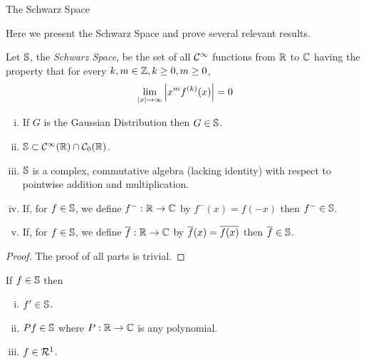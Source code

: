 \begin{section}{The Schwarz Space}

	Here we present the Schwarz Space and prove
	several relevant results.
	

\begin{defn}
	Let $\mathbb{S}$, the \emph{Schwarz Space}, be the set of all
	$\mathcal{C}^{\infty}$ functions from $\mathbb{R}$ to $\mathbb{C}$ having the
	property that for every $k,m \in \mathbb{Z}, k \geq 0,
	m \geq 0$,
		\begin{displaymath}
			\lim_{\left \vert {x} \right \vert \rightarrow \infty}
				\left \vert {x^m f^{(k)}(x)} \right \vert = 0
		\end{displaymath}
\end{defn}
	

\begin{prop}
	\begin{enumerate}[i)]
		\item
			If $G$ is the Gaussian Distribution then $G \in \mathbb{S}$.
		\item
			$\mathbb{S} \subset \mathcal{C}^{\infty}(\mathbb{R}) \cap \mathcal{C}_0(\mathbb{R})$.
		\item
			$\mathbb{S}$ is a complex, commutative algebra (lacking
			identity) with respect to pointwise addition and
			multiplication.
		\item
			If, for $f \in \mathbb{S}$, we define $f^-:\mathbb{R} \rightarrow 
			\mathbb{C}$ by $f^-(x) = f(-x)$ then $f^- \in \mathbb{S}$.
		\item
			If, for $f \in \mathbb{S}$, we define $\overline{f}:\mathbb{R} \rightarrow
			\mathbb{C}$ by $\overline{f}(x)=\overline{f(x)}$ then $\overline{f} \in \mathbb{S}$.
	\end{enumerate}
\end{prop}

\begin{proof}
	The proof of all parts is trivial.
\end{proof}


\begin{lemma}\label{lemma:S1}
	If $f \in \mathbb{S}$ then
		\begin{enumerate}[i)]
			\item
				$f' \in \mathbb{S}$.
			\item
				$Pf \in \mathbb{S}$ where $P:\mathbb{R} \rightarrow \mathbb{C}$
				is any polynomial.
			\item
				$f \in \mathcal{R}^1$.
		\end{enumerate}
\end{lemma}


\end{section}
